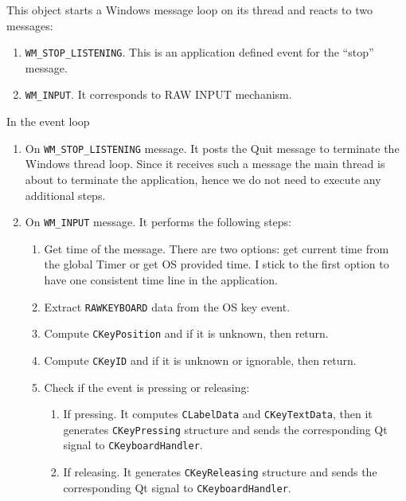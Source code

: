 \documentclass{article}
\begin{document}
This object starts a Windows message loop on its thread and reacts to two messages:
\begin{enumerate}
\item \verb"WM_STOP_LISTENING". This is an application defined event for the ``stop'' message.

\item \verb"WM_INPUT". It corresponds to RAW INPUT mechanism.
\end{enumerate}

In the event loop
\begin{enumerate}
\item On \verb"WM_STOP_LISTENING" message. It posts the Quit message to terminate the Windows thread loop. Since it receives such a message the main thread is about to terminate the application, hence we do not need to execute any additional steps.

\item On \verb"WM_INPUT" message. It performs the following steps:
\begin{enumerate}
\item Get time of the message. There are two options: get current time from the global Timer or get OS provided time. I stick to the first option to have one consistent time line in the application.

\item Extract \verb"RAWKEYBOARD" data from the OS key event.

\item Compute \verb"CKeyPosition" and if it is unknown, then return.

\item Compute \verb"CKeyID" and if it is unknown or ignorable, then return.

\item Check if the event is pressing or releasing:
\begin{enumerate}
\item If pressing. It computes \verb"CLabelData" and \verb"CKeyTextData", then it generates \verb"CKeyPressing" structure and sends the corresponding Qt signal to \verb"CKeyboardHandler".

\item If releasing. It generates \verb"CKeyReleasing" structure and sends the corresponding Qt signal to \verb"CKeyboardHandler".

\end{enumerate}
\end{enumerate}
\end{enumerate}
\end{document}
